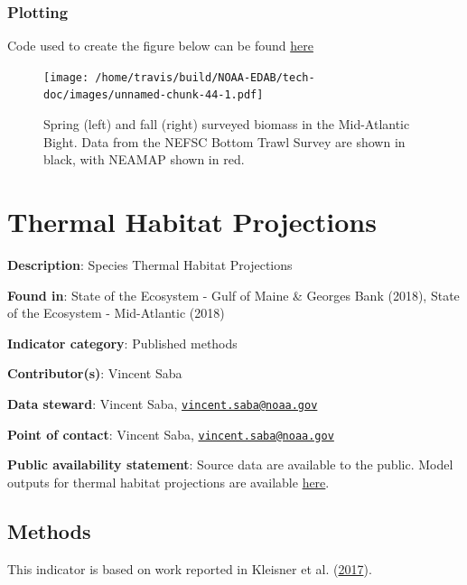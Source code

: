 \documentclass[
]{book}
\begin{document}
\hypertarget{plotting-33}{%
\subsection{Plotting}\label{plotting-33}}

Code used to create the figure below can be found \href{https://github.com/NOAA-EDAB/ecodata/blob/master/chunk-scripts/macrofauna.Rmd-agg-bio.R}{here}

\begin{figure}
\centering
\texttt{[image: /home/travis/build/NOAA-EDAB/tech-doc/images/unnamed-chunk-44-1.pdf]}
\caption{\label{fig:unnamed-chunk-44}Spring (left) and fall (right) surveyed biomass in the Mid-Atlantic Bight. Data from the NEFSC Bottom Trawl Survey are shown in black, with NEAMAP shown in red.}
\end{figure}

\hypertarget{thermal-habitat-projections}{%
\chapter{Thermal Habitat Projections}\label{thermal-habitat-projections}}

\textbf{Description}: Species Thermal Habitat Projections

\textbf{Found in}: State of the Ecosystem - Gulf of Maine \& Georges Bank (2018), State of the Ecosystem - Mid-Atlantic (2018)

\textbf{Indicator category}: Published methods

\textbf{Contributor(s)}: Vincent Saba

\textbf{Data steward}: Vincent Saba, \href{mailto:vincent.saba@noaa.gov}{\nolinkurl{vincent.saba@noaa.gov}}

\textbf{Point of contact}: Vincent Saba, \href{mailto:vincent.saba@noaa.gov}{\nolinkurl{vincent.saba@noaa.gov}}

\textbf{Public availability statement}: Source data are available to the public. Model outputs for thermal habitat projections are available \href{https://comet.nefsc.noaa.gov/erddap/info/index.html?page=1\&itemsPerPage=1000}{here}.

\hypertarget{methods-42}{%
\section{Methods}\label{methods-42}}

This indicator is based on work reported in Kleisner et al. (\protect\hyperlink{ref-Kleisner2017}{2017}).
\end{document}
